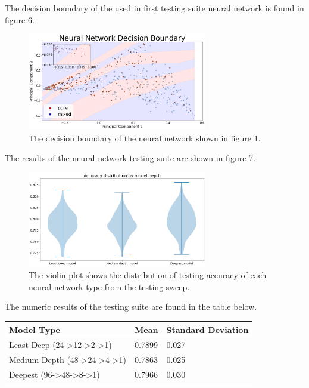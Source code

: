 \documentclass[12pt]{article}
\begin{document}
The decision boundary of the used in first testing suite neural network is found in figure 6. 
\begin{figure}[H]
\centering
\includegraphics[width=0.7\textwidth]{decboundary}
\caption{The decision boundary of the neural network shown in figure 1.}
\end{figure}
The results of the neural network testing suite are shown in figure 7. 
\begin{figure}[H]
\centering
\includegraphics[width=0.7\textwidth]{testOut128}
\caption{The violin plot shows the distribution of testing accuracy of each neural network type from the testing sweep.}
\end{figure}
The numeric results of the testing suite are found in the table below.  

\begin{table}[H]
\centering
\begin{tabular}{l|l|l}
\hline
\multicolumn{1}{|l|}{Model Type}                                   & Mean   & \multicolumn{1}{l|}{Standard Deviation} \\ \hline
Least Deep (24-\textgreater{}12-\textgreater{}2-\textgreater{}1)   & 0.7899 & 0.027                                   \\
Medium Depth (48-\textgreater{}24-\textgreater{}4-\textgreater{}1) & 0.7863 & 0.025                                   \\
Deepest (96-\textgreater{}48-\textgreater{}8-\textgreater{}1)      & 0.7966 & 0.030                                  
\end{tabular}
\end{table}
\end{document}
